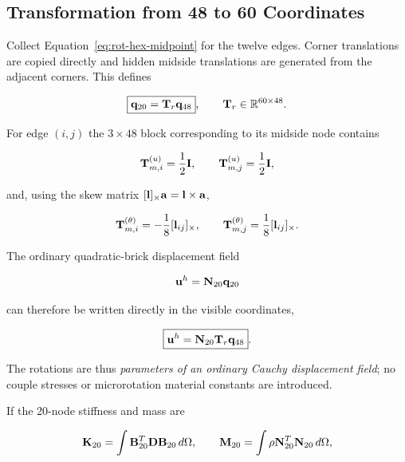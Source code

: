 \subsection{Transformation from 48 to 60 Coordinates}

Collect Equation~\eqref{eq:rot-hex-midpoint} for the twelve edges.  Corner
translations are copied directly and hidden midside translations are generated
from the adjacent corners.  This defines

\begin{equation}\label{eq:rot-hex-transform}
    \boxed{
    \mathbf{q}_{20}=\mathbf{T}_{r}\mathbf{q}_{48}
    },
    \qquad
    \mathbf{T}_{r}\in\mathbb{R}^{60\times48}.
\end{equation}

For edge $(i,j)$ the $3\times48$ block corresponding to its midside node contains

\begin{equation}
    \mathbf{T}_{m,i}^{(u)}=\frac12\mathbf{I},
    \qquad
    \mathbf{T}_{m,j}^{(u)}=\frac12\mathbf{I},
\end{equation}

and, using the skew matrix $[\mathbf{l}]_{\times}\mathbf{a}=\mathbf{l}\times\mathbf{a}$,

\begin{equation}
    \mathbf{T}_{m,i}^{(\theta)}=-\frac18[\mathbf{l}_{ij}]_{\times},
    \qquad
    \mathbf{T}_{m,j}^{(\theta)}= \frac18[\mathbf{l}_{ij}]_{\times}.
\end{equation}

The ordinary quadratic-brick displacement field

\begin{equation}
    \mathbf{u}^{h}=\mathbf{N}_{20}\mathbf{q}_{20}
\end{equation}

can therefore be written directly in the visible coordinates,

\begin{equation}
    \boxed{
    \mathbf{u}^{h}=\mathbf{N}_{20}\mathbf{T}_{r}\mathbf{q}_{48}
    }.
\end{equation}

The rotations are thus \emph{parameters of an ordinary Cauchy displacement
field}; no couple stresses or microrotation material constants are introduced.

If the 20-node stiffness and mass are

\begin{equation}
    \mathbf{K}_{20}
    =\int\mathbf{B}_{20}^{T}\mathbf{D}\mathbf{B}_{20}\,d\Omega,
    \qquad
    \mathbf{M}_{20}
    =\int\rho\mathbf{N}_{20}^{T}\mathbf{N}_{20}\,d\Omega,
\end{equation}

